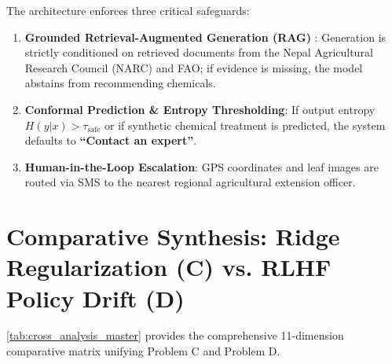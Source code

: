 \documentclass[11pt,a4paper]{article}
\theoremstyle{definition}
\theoremstyle{plain}
\theoremstyle{remark}
\begin{document}
The architecture enforces three critical safeguards:
\begin{enumerate}[noitemsep]
    \item \textbf{Grounded Retrieval-Augmented Generation (RAG)} \cite{lewis2020retrieval}: Generation is strictly conditioned on retrieved documents from the Nepal Agricultural Research Council (NARC) and FAO; if evidence is missing, the model abstains from recommending chemicals.
    \item \textbf{Conformal Prediction \& Entropy Thresholding}: If output entropy $H(y|x) > \tau_{\text{safe}}$ or if synthetic chemical treatment is predicted, the system defaults to \textbf{``Contact an expert''}.
    \item \textbf{Human-in-the-Loop Escalation}: GPS coordinates and leaf images are routed via SMS to the nearest regional agricultural extension officer.
\end{enumerate}

\section{Comparative Synthesis: Ridge Regularization (C) vs. RLHF Policy Drift (D)}

\cref{tab:cross_analysis_master} provides the comprehensive 11-dimension comparative matrix unifying Problem C and Problem D.
\end{document}
